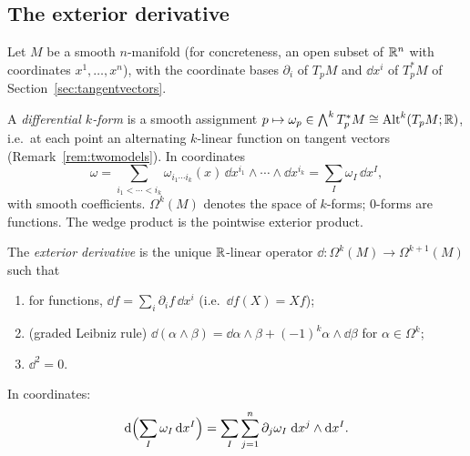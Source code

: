 \subsection{The exterior derivative}\label{sec:dform}
Let $M$ be a smooth $n$-manifold (for concreteness, an open subset of $\mathbb{R}^n$ with coordinates $x^1,\dots,x^n$), with the coordinate bases
$\partial_i$ of $T_pM$ and $\dd x^i$ of $T_p^*M$ of Section~\ref{sec:tangentvectors}.

\begin{definition}
A \emph{differential $k$-form} is a smooth assignment $p\mapsto\omega_p\in\bigwedge^kT_p^*M\cong\mathrm{Alt}^k(T_pM;\mathbb{R})$, i.e.\ at each point an alternating $k$-linear function on tangent vectors (Remark~\ref{rem:twomodels}). In coordinates
\[
 \omega=\sum_{i_1<\cdots<i_k}\omega_{i_1\cdots i_k}(x)\,\dd x^{i_1}\wedge\cdots\wedge\dd x^{i_k}=\sum_I\omega_I\,\dd x^I,
\]
with smooth coefficients. $\Omega^k(M)$ denotes the space of $k$-forms; $0$-forms are functions. The wedge product is the pointwise exterior product.
\end{definition}

\begin{definition}\label{def:d}
The \emph{exterior derivative} is the unique $\mathbb{R}$-linear operator $\dd:\Omega^k(M)\to\Omega^{k+1}(M)$ such that
\begin{enumerate}
  \item for functions, $\dd f=\sum_i\partial_if\,\dd x^i$ (i.e.\ $\dd f(X)=Xf$);
  \item (graded Leibniz rule) $\dd(\alpha\wedge\beta)=\dd\alpha\wedge\beta+(-1)^k\alpha\wedge\dd\beta$ for $\alpha\in\Omega^k$;
  \item $\dd^2=0$.
\end{enumerate}
In coordinates:
\begin{equation}\label{eq:dcoord}
 \mathrm{d}\Bigl(\sum_I\omega_I\,\mathrm{d} x^I\Bigr)=\sum_I\sum_{j=1}^n\partial_j\omega_I\;\mathrm{d} x^j\wedge\mathrm{d} x^I .
\end{equation}
\end{definition}

